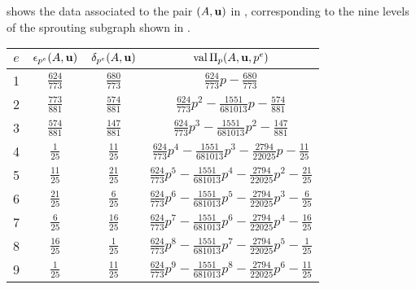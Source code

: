 \documentclass{amsart}
\begin{document}
\begin{example}
   \label{ex: new example.2}
    shows the data associated to the pair $(A,\mathbf{u})$ in , corresponding to the nine levels of the sprouting subgraph shown in .
   \begin{table}
      \begin{center}
         \begingroup
         \setlength{\tabcolsep}{8pt} %
         \renewcommand{\arraystretch}{1.4} %
         \begin{tabular}{cccc}
           \toprule
           $e$ & $\epsilon_{p^e}(A,\mathbf{u})$ & $\delta_{p^e}(A,\mathbf{u})$ & $\operatorname{val}\Pi_p(A,\mathbf{u},p^e)$ \\
           \midrule
           1 & $\frac{624}{773}$ & $\frac{680}{773}$ & $\frac{624}{773}p - \frac{680}{773}$\\
           2 & $\frac{773}{881}$ & $\frac{574}{881}$ & $\frac{624}{773}p^2 - \frac{1551}{681013}p - \frac{574}{881}$ \\
           3 & $\frac{574}{881}$ & $\frac{147}{881}$ & $\frac{624}{773}p^3 - \frac{1551}{681013}p^2 - \frac{147}{881}$ \\
           4 & $\frac{1}{25}$ & $\frac{11}{25}$ & $\frac{624}{773}p^4 - \frac{1551}{681013}p^3 - \frac{2794}{22025}p - \frac{11}{25}$ \\
           5 & $\frac{11}{25}$ & $\frac{21}{25}$ & $\frac{624}{773}p^5 - \frac{1551}{681013}p^4 - \frac{2794}{22025}p^2 - \frac{21}{25}$ \\
           6 & $\frac{21}{25}$ & $\frac{6}{25}$ & $\frac{624}{773}p^6 - \frac{1551}{681013}p^5 - \frac{2794}{22025}p^3 - \frac{6}{25}$ \\
           7 & $\frac{6}{25}$ & $\frac{16}{25}$ & $\frac{624}{773}p^7 - \frac{1551}{681013}p^6 - \frac{2794}{22025}p^4 - \frac{16}{25}$ \\
           8 & $\frac{16}{25}$ & $\frac{1}{25}$ & $\frac{624}{773}p^8 - \frac{1551}{681013}p^7 - \frac{2794}{22025}p^5 - \frac{1}{25}$ \\
           9 & $\frac{1}{25}$ & $\frac{11}{25}$ & $\frac{624}{773}p^9 - \frac{1551}{681013}p^8 - \frac{2794}{22025}p^6 - \frac{11}{25}$ \\
           \bottomrule
         \end{tabular}
         \endgroup

\end{center}
\end{table}
\end{example}
\end{document}
